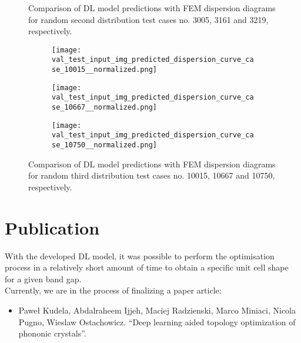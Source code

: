\documentclass[11pt,a4paper]{report}
\begin{document}
\begin{sloppypar}
\begin{figure}[ht!]
\begin{subfigure}[b]{0.32\textwidth}
			\end{subfigure}			
			\caption{Comparison of DL model predictions with FEM dispersion diagrams for random second distribution test cases no. 3005, 3161 and 3219, respectively.}
			\label{fig:second}				
		\end{figure}
		\begin{figure}[ht!]	
			\begin{subfigure}[b]{0.32\textwidth}
				\centering
				\texttt{[image: val\_test\_input\_img\_predicted\_dispersion\_curve\_case\_10015\_\_normalized.png]}
				\label{fig:10015}
			\end{subfigure}
			\hfill
			\begin{subfigure}[b]{0.32\textwidth}
				\centering
				\texttt{[image: val\_test\_input\_img\_predicted\_dispersion\_curve\_case\_10667\_\_normalized.png]}
				\label{fig:10667}
			\end{subfigure}
			\hfill
			\begin{subfigure}[b]{0.32\textwidth}
				\centering
				\texttt{[image: val\_test\_input\_img\_predicted\_dispersion\_curve\_case\_10750\_\_normalized.png]}
				\label{fig:10750}
			\end{subfigure}
			\caption{Comparison of DL model predictions with FEM dispersion diagrams for random third distribution test cases no. 10015, 10667 and 10750, respectively.}
			\label{fig:third}
		\end{figure}
		
		
		\newpage
		\section{Publication}
		\noindent With the developed DL model, it was possible to perform the optimisation process in a relatively short amount of time to obtain a specific unit cell shape for a given band gap.\\
		Currently, we are in the process of finalizing a paper article:
		\begin{itemize}
			\item \textup{Paweł Kudela}, \textup{Abdalraheem Ijjeh}, \textup{Maciej Radzienski}, \textup{Marco Miniaci}, \textup{Nicola Pugno}, \textup{Wieslaw Ostachowicz}. \enquote{Deep learning aided topology optimization of phononic crystals}.
		\end{itemize}
			
		
		
	\end{sloppypar}	
\end{document}
